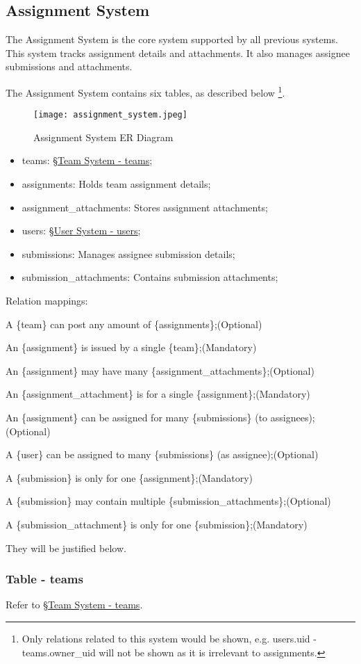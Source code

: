 \documentclass[12pt]{report}
\newcommand{\n}{\par}
\newcommand{\br}{\n\vspace{1 em}\n}
\begin{document}
\subsection{Assignment System} \label{data-layer.design.assignment-system}
The Assignment System is the core system supported by all previous systems.
This system tracks assignment details and attachments.
It also manages assignee submissions and attachments.
\br
The Assignment System contains six tables, as described below
\footnote{Only relations related to this system would be shown,
	e.g. users.uid - teams.owner\_uid will not be shown as it is irrelevant to assignments.}.
\begin{figure}[h!]
	\centering
	\texttt{[image: assignment\_system.jpeg]}
	\caption{Assignment System ER Diagram}
	\label{fig:assignment-system-er}
\end{figure}
\begin{itemize}
	\item teams: \S \hyperref[data-layer.design.team-system.teams]{Team System - teams};
	\item assignments: Holds team assignment details;
	\item assignment\_attachments: Stores assignment attachments;
	\item users: \S \hyperref[data-layer.design.user-system.users]{User System - users};
	\item submissions: Manages assignee submission details;
	\item submission\_attachments: Contains submission attachments;
\end{itemize}
Relation mappings:\n
A \{team\} can post any amount of \{assignments\};\null\hfill (Optional)\n
An \{assignment\} is issued by a single \{team\};\null\hfill (Mandatory)
\br
An \{assignment\} may have many \{assignment\_attachments\};\null\hfill (Optional)\n
An \{assignment\_attachment\} is for a single \{assignment\};\null\hfill (Mandatory)
\br
An \{assignment\} can be assigned for many \{submissions\} (to assignees);\null\hfill (Optional)\n
A \{user\} can be assigned to many \{submissions\} (as assignee);\null\hfill (Optional)\n
A \{submission\} is only for one \{assignment\};\null\hfill (Mandatory)
\br
A \{submission\} may contain multiple \{submission\_attachments\};\null\hfill (Optional)\n
A \{submission\_attachment\} is only for one \{submission\};\null\hfill (Mandatory)
\br
They will be justified below.

\subsubsection{Table - teams} \label{data-layer.design.assignment-system.teams}
Refer to \S \hyperref[data-layer.design.team-system.teams]{Team System - teams}.
\end{document}
